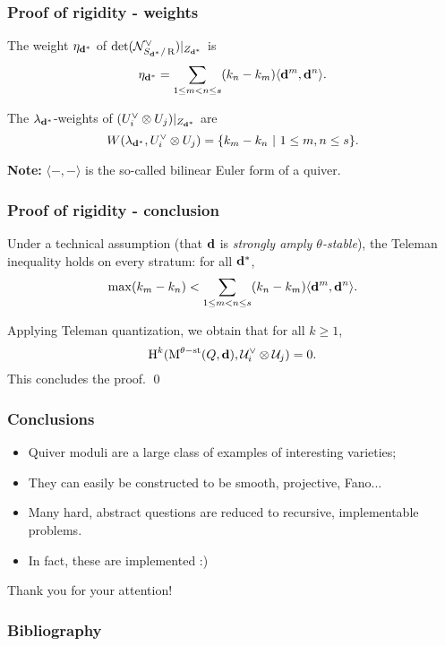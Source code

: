 \documentclass{beamer}
\begin{document}
\begin{frame}
    \frametitle{Proof of rigidity - weights}
\begin{lemma}
The weight $\eta_{\mathbf{d}^*}$ of $\det(\mathcal{N}^{\vee}_{S_{\mathbf{d}^*}/\operatorname{R}})|_{Z_{\mathbf{d}^*}}$ is
\[\eta_{\mathbf{d}^*} = \sum_{1 \leq m < n \leq s} (k_n - k_m)\langle \mathbf{d}^m, \mathbf{d}^n \rangle.\]
\end{lemma} \pause

\begin{lemma}
    The $\lambda_{\mathbf{d}^*}$-weights of $(U^{\vee}_i \otimes {U}_j)|_{Z_{\mathbf{d}^*}}$ are
    \[W(\lambda_{\mathbf{d}^*}, U_i^{\vee} \otimes U_j) = \{k_m - k_n ~|~ 1 \leq m, n \leq s\}.\]
\end{lemma} \pause
{\bf Note: } $\langle -,-\rangle$ is the so-called bilinear Euler form of a quiver.
\end{frame}

\begin{frame}
    \frametitle{Proof of rigidity - conclusion}
\begin{theorem}

    Under a technical assumption (that $\mathbf{d}$ is \emph{strongly amply $\theta$-stable}),
    the Teleman inequality holds on every stratum: for all $\mathbf{d}^*$,
    \[\max(k_m - k_n) < \sum_{1 \leq m < n \leq s} (k_n - k_m)\langle \mathbf{d}^m, \mathbf{d}^n \rangle.\] \pause
\end{theorem}
\begin{corollary}
    
    Applying Teleman quantization, we obtain that for all $k \geq 1$,
    \[ \operatorname{H}^k(\operatorname{M}^{\theta-\mathrm{st}}(Q, \mathbf{d}), \mathcal{U}^{\vee}_i \otimes \mathcal{U}_j) = 0. \]
    This concludes the proof. \qed \pause
\end{corollary}
\end{frame}
\begin{frame}
    \frametitle{Conclusions}
\begin{itemize}
\item Quiver moduli are a large class of examples of interesting varieties; \pause
\item They can easily be constructed to be smooth, projective, Fano... \pause 
\item Many hard, abstract questions are reduced to recursive, implementable problems. \pause
\item In fact, these are implemented :)
\end{itemize}
\end{frame}
\begin{frame}
\begin{center}
    Thank you for your attention!
\end{center}
\end{frame}

\begin{frame}
    \frametitle{Bibliography}
    \printbibliography
\end{frame}
\end{document}

